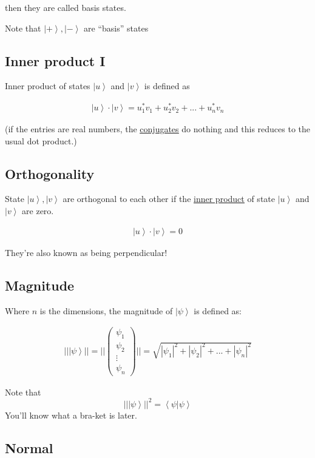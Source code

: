 \documentclass[
]{article}
\let\oldhyperref\hyperref
\renewcommand{\hyperref}[2][]{\oldhyperref[#1]{\underline{#2}}}
\providecommand{\ket}[1]{\left\lvert #1 \right\rangle}
\providecommand{\braket}[1]{\left\langle #1 \right\rangle}
\begin{document}
then they are called basis states.

Note that \(\ket{+},\ket{-}\) are ``basis''
states

\subsection{Inner product I}\label{inner-product}

Inner product of states \(\ket{u}\) and \(\ket{v}\) is defined as

\begin{gather*}
	\ket{u}\cdot \ket{v}=u_1^*v_1+u_2^*v_2+...+u_n^*v_n
\end{gather*}

(if the entries are real numbers, the \hyperref[conjugate]{conjugates} do nothing and this
reduces to the usual dot product.)

\subsection{Orthogonality}\label{orthogonality}

State \(\ket{u},\ket{v}\) are orthogonal to each other if the
\hyperref[inner-product]{inner
	product} of state \(\ket{u}\) and \(\ket{v}\) are zero.

\begin{gather*}
	\ket{u}\cdot \ket{v}=0
\end{gather*}

They're also known as being perpendicular!


\subsection{Magnitude}\label{magnitude}

Where \(n\) is the dimensions, the magnitude of \(\ket{\psi}\) is
defined as:

\begin{gather*}
	||\ket{\psi}||=||\begin{pmatrix}\psi_1\\\psi_2\\\vdots\\\psi_n\end{pmatrix}||=\sqrt{|\psi_1|^2+|\psi_2|^2+...+|\psi_n|^2}
\end{gather*}

Note that
\[
	||\ket{\psi}||^2=\braket{\psi|\psi}
\]
You'll know what a bra-ket is later.

\subsection{Normal}\label{normal}
\end{document}
